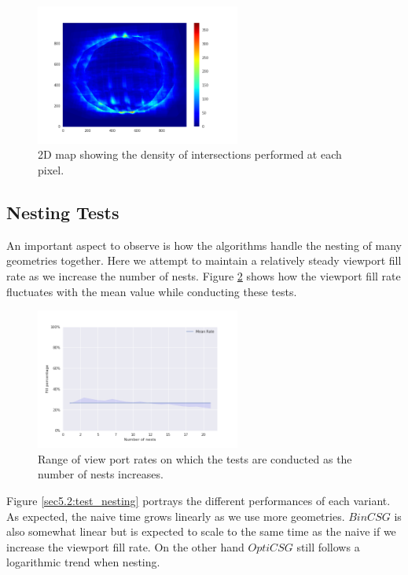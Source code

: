 \documentclass[a4paper,11pt,oneside]{article}
\begin{document}
\begin{figure}[H]
	\centering
	\includegraphics[width=0.6\textwidth]{section5/plots/test_count_density_optim.png}
	\caption{2D map showing the density of intersections performed at each pixel.}
	\label{sec5.1:test_count_density_optim}
\end{figure}


\subsection{Nesting Tests}

An important aspect to observe is how the algorithms handle the nesting of many geometries together. Here we attempt to maintain a relatively steady viewport fill rate as we increase the number of nests. Figure \ref{sec5.2:test_nesting_rates} shows how the viewport fill rate fluctuates with the mean value while conducting these tests.

\begin{figure}[H]
	\centering
	\includegraphics[width=0.6\textwidth]{section5/plots/test_nesting_rates.png}
	\caption{Range of view port rates on which the tests are conducted as the number of nests increases.}
	\label{sec5.2:test_nesting_rates}
\end{figure}


Figure \ref{sec5.2:test_nesting} portrays the different performances of each variant. As expected, the naive time grows linearly as we use more geometries. $BinCSG$ is also somewhat linear but is expected to scale to the same time as the naive if we increase the viewport fill rate. On the other hand $OptiCSG$ still follows a logarithmic trend when nesting. 
\end{document}
